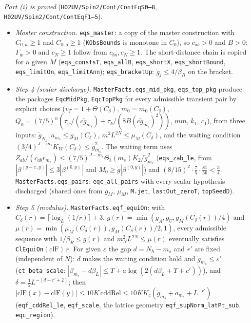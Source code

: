 \documentclass[11pt]{amsart}
\theoremstyle{definition}
\theoremstyle{remark}
\numberwithin{equation}{section}
\begin{document}
\emph{Part (i) is proved} (\texttt{H02UV/Spin2/Cont/ContEqS0--8}, \texttt{H02UV/Spin2/Cont/ContEqF1--5}).
\begin{itemize}
\item \emph{Master construction.} \texttt{eqs\_master}: a copy of the master construction with $C_{0,u}\ge1$ and
$C_{0,o}\ge1$ (\texttt{KObsBounds} is monotone in $C_0$), so $c_{ab}>0$ and $B>0$; $\Gamma_w>0$ and $c_N\ge1$ follow from
$c_{bn},c_N\ge1$. The short-distance chain is copied for a given $M$ (\texttt{eqs\_constsT}, \texttt{eqs\_allB},
\texttt{eqs\_shortX}, \texttt{eqs\_shortBound}, \texttt{eqs\_limitOn}, \texttt{eqs\_limitAnn}); \texttt{eqs\_bracketUp}:
$\check g_j\le4/\beta_R$ on the bracket.
\item \emph{Step 4 (scalar discharge).} \texttt{MasterFacts.eqs\_mid\_pkg}, \texttt{eqs\_top\_pkg} produce the packages
\texttt{EqcMidPkg}, \texttt{EqcTopPkg} for every admissible transient pair by explicit choices ($v_T=1+\Theta(C_\delta)$,
$m_0=m_0(C_\delta)$, $Q_0=(7/5)^n(\tau_w/(c\check g_{m_s})+\tau_k/(8B(c\check g_{m_s})^2))$, $mm$, $k_1$, $c_1$), from three
inputs: $\check g_{N_h},a_{m_s}\le g_M(C_\delta)$, $m^2L^{2N}\le\mu_M(C_\delta)$, and the waiting condition
$(3/4)^{J-m_s}K_W(C_\delta)\le\check g_{m_s}^2$. The waiting term uses $Z_{ab}/(c_{ab}r_{m_s})\le
(7/5)^{J-m_s}\Theta_b(m_s)K_2/\check g_{m_s}^2$ (\texttt{eqs\_zab\_le}, from $|\beta^{(y-x,y)}|\le3|\beta^{(0,y)}|$ and
$M_0\ge\check g|\beta^{(0,y)}|$) and $(8/15)^2\cdot\frac75\cdot\frac{81}{56}<\frac34$. \texttt{MasterFacts.eqs\_pairs}:
\texttt{eqc\_all\_pairs} with every scalar hypothesis discharged (shared ones from $g_M$, $\mu_M$, \texttt{M.jet},
\texttt{lastOut\_zeroT}, \texttt{topSeedD}).
\item \emph{Step 5 (modulus).} \texttt{MasterFacts.eqf\_equiOn}: with $C_\delta(r)=\lceil\log_L(1/r)\rceil+3$,
$g(r)=\min(g_A,g_U,g_M(C_\delta(r))/4)$ and $\mu(r)=\min(\mu_M(C_\delta(r)),g_M(C_\delta(r))/2,1)$, every admissible sequence
with $1/\beta_R\le g(r)$ and $m_N^2L^{2N}\le\mu(r)$ eventually satisfies \texttt{ClEquiOn}$(\mathrm{clF})\,r$. For given
$\varepsilon$ the gap $d=N_h-m_s$ and $r'$ are fixed (independent of $N$): $d$ makes the waiting condition hold and
$\check g_{m_s}\le\varepsilon'$ (\texttt{ct\_beta\_scale}: $|\beta_{m_s}-d\beta_L|\le T+a\log(2(d\beta_L+T+c'))$), and
$\delta=\frac12L^{-(d+r'+2)}$; then $|\mathrm{clF}(x)-\mathrm{clF}(y)|\le10K\,\mathrm{cddRel}\le
10KK_c(\check g_{m_s}+a_{m_s}+L^{-r'})$ (\texttt{eqf\_cddRel\_le}, \texttt{eqf\_scale}, the lattice geometry
\texttt{eqf\_supNorm\_latPt\_sub}, \texttt{eqc\_region}).

\end{itemize}
\end{document}
